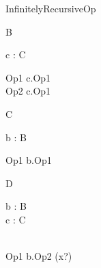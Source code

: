 \begin{zsection}
  \SECTION InfinitelyRecursiveOp
\end{zsection}

\begin{class}{B}
  \begin{state}
    c : C
  \end{state}
  Op1 \sdef c.Op1\\
  Op2 \sdef c.Op1 \land [x? : \nat]
\end{class}

\begin{class}{C}
  \begin{state}
   b : B
  \end{state}
  Op1 \sdef b.Op1\\  
\end{class}

\begin{class}{D}
  \begin{state}
    b : B\\
    c : C
  \end{state}\\
  Op1 \sdef b.Op2 \hide (x?)
\end{class}
